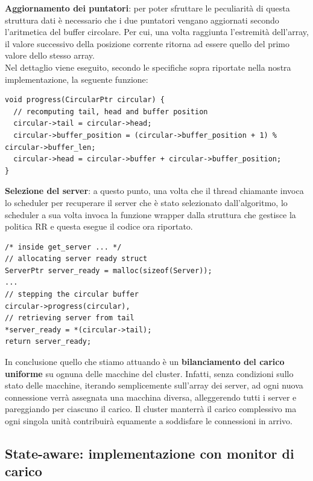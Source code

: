 \documentclass[italian]{tktltiki2}
\begin{document}
\textbf{Aggiornamento dei puntatori}: per poter sfruttare le peculiarità di questa struttura dati è necessario che i due puntatori vengano aggiornati secondo l'aritmetica del buffer circolare. Per cui, una volta raggiunta l'estremità dell'array, il valore successivo della posizione corrente ritorna ad essere quello del primo valore dello stesso array. 
\\
Nel dettaglio viene eseguito, secondo le specifiche sopra riportate nella nostra implementazione, la seguente funzione:
\begin{lstlisting}
void progress(CircularPtr circular) {
  // recomputing tail, head and buffer position
  circular->tail = circular->head;
  circular->buffer_position = (circular->buffer_position + 1) % circular->buffer_len;
  circular->head = circular->buffer + circular->buffer_position;
}
\end{lstlisting}
\textbf{Selezione del server}: a questo punto, una volta che il thread chiamante invoca lo scheduler per recuperare il server che è stato selezionato dall'algoritmo, lo scheduler a sua volta invoca la funzione wrapper dalla struttura che gestisce la politica RR e questa esegue il codice ora riportato.
\begin{lstlisting}
/* inside get_server ... */
// allocating server ready struct
ServerPtr server_ready = malloc(sizeof(Server));
...
// stepping the circular buffer
circular->progress(circular),
// retrieving server from tail 
*server_ready = *(circular->tail);
return server_ready;
\end{lstlisting}
In conclusione quello che stiamo attuando è un \textbf{bilanciamento del carico uniforme} su ognuna delle macchine del cluster. Infatti, senza condizioni sullo stato delle macchine, iterando semplicemente sull'array dei server, ad ogni nuova connessione verrà assegnata una macchina diversa, alleggerendo tutti i server e pareggiando per ciascuno il carico. Il cluster manterrà il carico complessivo ma ogni singola unità contribuirà equamente a soddisfare le connessioni in arrivo.
\newpage
\subsection{State-aware: implementazione con monitor di carico}
\end{document}

